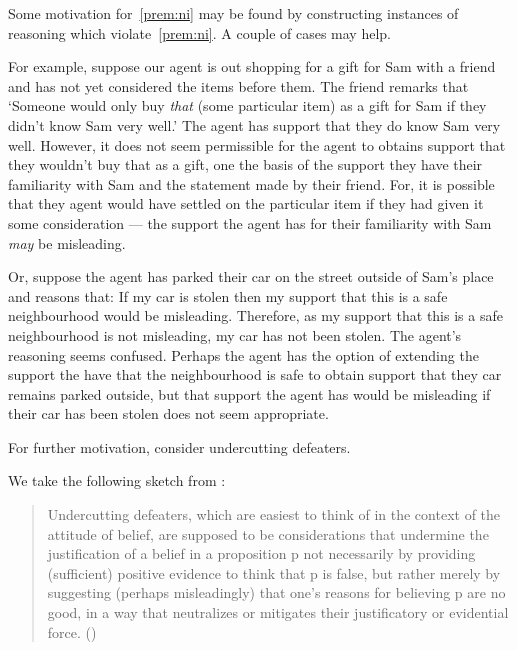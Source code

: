 \begin{note}
  Some motivation for~\ref{prem:ni} may be found by constructing instances of reasoning which violate~\ref{prem:ni}.
  A couple of cases may help.

  For example, suppose our agent is out shopping for a gift for Sam with a friend and has not yet considered the items before them.
  The friend remarks that `Someone would only buy \emph{that} (some particular item) as a gift for Sam if they didn't know Sam very well.'
  The agent has support that they do know Sam very well.
  However, it does not seem permissible for the agent to obtains support that they wouldn't buy that as a gift, one the basis of the support they have their familiarity with Sam and the statement made by their friend.
  For, it is possible that they agent would have settled on the particular item if they had given it some consideration --- the support the agent has for their familiarity with Sam \emph{may} be misleading.

  Or, suppose the agent has parked their car on the street outside of Sam's place and reasons that:
  If my car is stolen then my support that this is a safe neighbourhood would be misleading.
  Therefore, as my support that this is a safe neighbourhood is not misleading, my car has not been stolen.
  The agent's reasoning seems confused.
  Perhaps the agent has the option of extending the support the have that the neighbourhood is safe to obtain support that they car remains parked outside, but that support the agent has would be misleading if their car has been stolen does not seem appropriate.
\end{note}

\begin{note}
  For further motivation, consider undercutting defeaters.

  We take the following sketch from \textcite{Worsnip:2018aa}:
  \begin{quote}
    Undercutting defeaters, which are easiest to think of in the context of the attitude of belief, are supposed to be considerations that undermine the justification of a belief in a proposition p not necessarily by providing (sufficient) positive evidence to think that p is false, but rather merely by suggesting (perhaps misleadingly) that one’s reasons for believing p are no good, in a way that neutralizes or mitigates their justificatory or evidential force.\nolinebreak
    \mbox{}\hfill\mbox{(\citeyear[29]{Worsnip:2018aa})}
  \end{quote}
\end{note}

